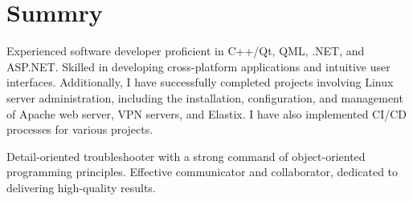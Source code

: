 \section{Summry}

Experienced software developer proficient in C++/Qt, QML, .NET, and ASP.NET. Skilled in developing cross-platform applications and intuitive user interfaces. Additionally, I have successfully completed projects involving Linux server administration, including the installation, configuration, and management of Apache web server, VPN servers, and Elastix. I have also implemented CI/CD processes for various projects.


Detail-oriented troubleshooter with a strong command of object-oriented programming principles. Effective communicator and collaborator, dedicated to delivering high-quality results.

